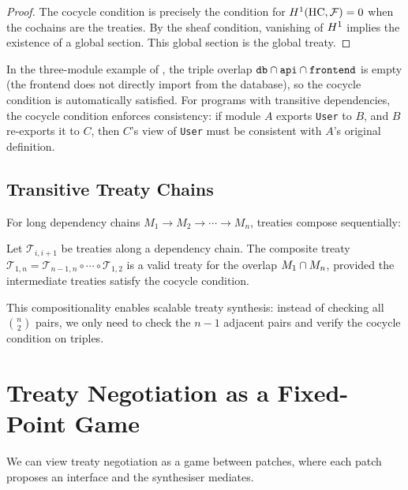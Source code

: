 \documentclass[11pt]{article}
\newcommand{\treaty}{\mathcal{T}}
\newcommand{\HC}{\mathrm{HC}}
\newcommand{\Sect}{\mathcal{F}}             %
\begin{document}
\begin{proof}
The cocycle condition is precisely the condition for
$\Hcoh{1}(\HC, \Sect) = 0$ when the cochains are the treaties.
By the sheaf condition, vanishing of $H^{1}$ implies the existence
of a global section.  This global section is the global treaty.
\end{proof}

In the three-module example of , the
triple overlap $\texttt{db} \cap \texttt{api} \cap \texttt{frontend}$
is empty (the frontend does not directly import from the database),
so the cocycle condition is automatically satisfied.  For programs
with transitive dependencies, the cocycle condition enforces
consistency: if module $A$ exports \texttt{User} to $B$, and $B$
re-exports it to $C$, then $C$'s view of \texttt{User} must be
consistent with $A$'s original definition.

\subsection{Transitive Treaty Chains}

For long dependency chains $M_1 \to M_2 \to \cdots \to M_n$,
treaties compose sequentially:

\begin{proposition}\label{prop:chain}
Let $\treaty_{i,i+1}$ be treaties along a dependency chain.
The composite treaty $\treaty_{1,n} = \treaty_{n-1,n} \circ
\cdots \circ \treaty_{1,2}$ is a valid treaty for the overlap
$M_1 \cap M_n$, provided the intermediate treaties satisfy
the cocycle condition.
\end{proposition}

This compositionality enables scalable treaty synthesis: instead of
checking all $\binom{n}{2}$ pairs, we only need to check the
$n - 1$ adjacent pairs and verify the cocycle condition on triples.

\section{Treaty Negotiation as a Fixed-Point Game}\label{sec:game}

We can view treaty negotiation as a game between patches, where each
patch proposes an interface and the synthesiser mediates.
\end{document}
